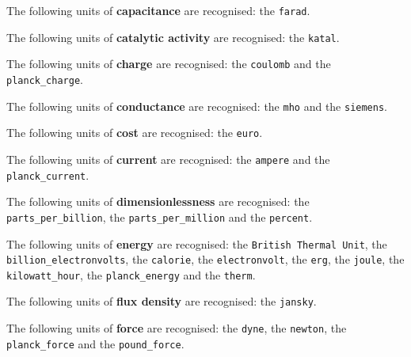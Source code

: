 \noindent The following units of {\bf capacitance} are recognised:\newline
\noindent the {\tt farad}.\vspace{5mm}

\noindent The following units of {\bf catalytic activity} are recognised:\newline
\noindent the {\tt katal}.\vspace{5mm}

\noindent The following units of {\bf charge} are recognised:\newline
\noindent the {\tt coulomb} and the {\tt planck\_\-charge}.\vspace{5mm}

\noindent The following units of {\bf conductance} are recognised:\newline
\noindent the {\tt mho} and the {\tt siemens}.\vspace{5mm}

\noindent The following units of {\bf cost} are recognised:\newline
\noindent the {\tt euro}.\vspace{5mm}

\noindent The following units of {\bf current} are recognised:\newline
\noindent the {\tt ampere} and the {\tt planck\_\-current}.\vspace{5mm}

\noindent The following units of {\bf dimensionlessness} are recognised:\newline
\noindent the {\tt parts\_\-per\_\-billion}, the {\tt parts\_\-per\_\-million} and the {\tt percent}.\vspace{5mm}

\noindent The following units of {\bf energy} are recognised:\newline
\noindent the {\tt British Thermal Unit}, the {\tt billion\_\-electronvolts}, the {\tt calorie}, the {\tt electronvolt}, the {\tt erg}, the {\tt joule}, the {\tt kilowatt\_\-hour}, the {\tt planck\_\-energy} and the {\tt therm}.\vspace{5mm}

\noindent The following units of {\bf flux density} are recognised:\newline
\noindent the {\tt jansky}.\vspace{5mm}

\noindent The following units of {\bf force} are recognised:\newline
\noindent the {\tt dyne}, the {\tt newton}, the {\tt planck\_\-force} and the {\tt pound\_\-force}.\vspace{5mm}


